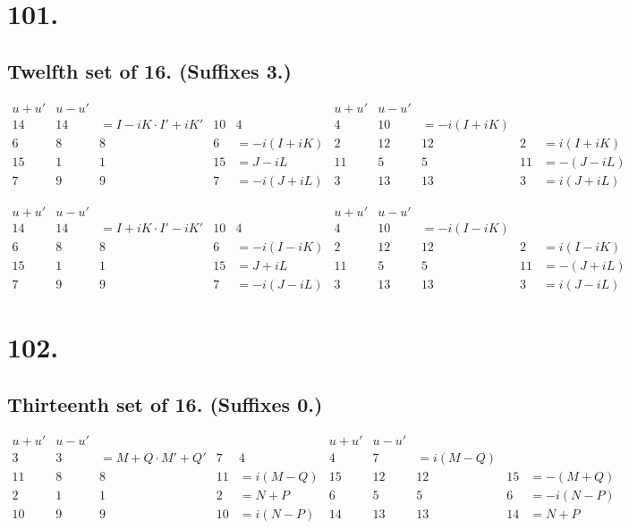 \documentclass[11pt,a4paper]{book}
\begin{document}
\newpage
\section*{101.}
\label{sec:101}

\subsection*{Twelfth set of 16. (Suffixes 3.)}

\[
\begin{array}{c|cccc|c|cccc}
u+u' & u-u' & & & & u+u' & u-u' & & & \\
\hline
14 & 14 & = I-iK \cdot I'+iK' & 10 & 4 & 4 & 10 & = -i(I+iK) \\
6 & 8 & 8 & 6 & = -i(I+iK) & 2 & 12 & 12 & 2 & = i(I+iK) \\
15 & 1 & 1 & 15 & = J-iL & 11 & 5 & 5 & 11 & = -(J-iL) \\
7 & 9 & 9 & 7 & = -i(J+iL) & 3 & 13 & 13 & 3 & = i(J+iL)
\end{array}
\]

\[
\begin{array}{c|cccc|c|cccc}
u+u' & u-u' & & & & u+u' & u-u' & & & \\
\hline
14 & 14 & = I+iK \cdot I'-iK' & 10 & 4 & 4 & 10 & = -i(I-iK) \\
6 & 8 & 8 & 6 & = -i(I-iK) & 2 & 12 & 12 & 2 & = i(I-iK) \\
15 & 1 & 1 & 15 & = J+iL & 11 & 5 & 5 & 11 & = -(J+iL) \\
7 & 9 & 9 & 7 & = -i(J-iL) & 3 & 13 & 13 & 3 & = i(J-iL)
\end{array}
\]

\newpage
\section*{102.}
\label{sec:102}

\subsection*{Thirteenth set of 16. (Suffixes 0.)}

\[
\begin{array}{c|cccc|c|cccc}
u+u' & u-u' & & & & u+u' & u-u' & & & \\
\hline
3 & 3 & = M+Q \cdot M'+Q' & 7 & 4 & 4 & 7 & = i(M-Q) \\
11 & 8 & 8 & 11 & = i(M-Q) & 15 & 12 & 12 & 15 & = -(M+Q) \\
2 & 1 & 1 & 2 & = N+P & 6 & 5 & 5 & 6 & = -i(N-P) \\
10 & 9 & 9 & 10 & = i(N-P) & 14 & 13 & 13 & 14 & = N+P
\end{array}
\]
\end{document}
